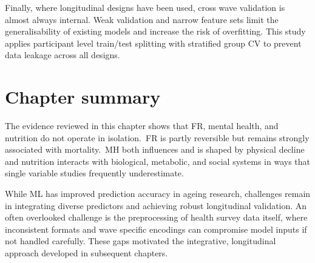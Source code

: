 Finally, where longitudinal designs have been used, cross wave validation is almost always internal. Weak validation and narrow feature sets limit the generalisability of existing models and increase the risk of overfitting. This study applies participant level train/test splitting with stratified group \gls{CV} to prevent data leakage across all designs.

\section{Chapter summary}
The evidence reviewed in this chapter shows that \gls{FR}, mental health, and nutrition do not operate in isolation.\ \gls{FR} is partly reversible but remains strongly associated with mortality.\ \gls{MH} both influences and is shaped by physical decline and nutrition interacts with biological, metabolic, and social systems in ways that single variable studies frequently underestimate.

While \gls{ML} has improved prediction accuracy in ageing research, challenges remain in integrating diverse predictors and achieving robust longitudinal validation. An often overlooked challenge is the preprocessing of health survey data itself, where inconsistent formats and wave specific encodings can compromise model inputs if not handled carefully. These gaps motivated the integrative, longitudinal approach developed in subsequent chapters.

